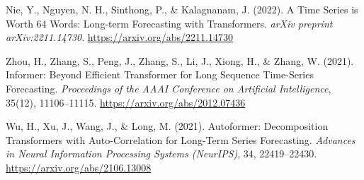 \documentclass{article}
\begin{document}
\begin{thebibliography}{9}
Nie, Y., Nguyen, N. H., Sinthong, P., \& Kalagnanam, J. (2022).
A Time Series is Worth 64 Words: Long-term Forecasting with Transformers.
\textit{arXiv preprint arXiv:2211.14730}.
\url{https://arxiv.org/abs/2211.14730}

Zhou, H., Zhang, S., Peng, J., Zhang, S., Li, J., Xiong, H., \& Zhang, W. (2021). 
Informer: Beyond Efficient Transformer for Long Sequence Time-Series Forecasting. 
\textit{Proceedings of the AAAI Conference on Artificial Intelligence}, 35(12), 11106–11115. 
\url{https://arxiv.org/abs/2012.07436}

Wu, H., Xu, J., Wang, J., \& Long, M. (2021). 
Autoformer: Decomposition Transformers with Auto-Correlation for Long-Term Series Forecasting. 
\textit{Advances in Neural Information Processing Systems (NeurIPS)}, 34, 22419–22430. 
\url{https://arxiv.org/abs/2106.13008}

\end{thebibliography}
\end{document}
